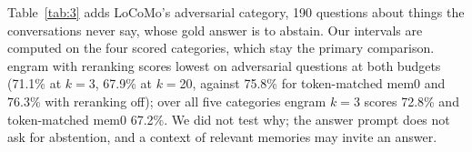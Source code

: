 \documentclass[11pt]{article}
\newcommand{\src}[1]{}
\begin{document}
Table~\ref{tab:3} adds LoCoMo's adversarial category, 190\src{bench/results/heldout\_extra.json} questions about things the conversations never say, whose gold answer is to abstain. Our intervals are computed on the four scored categories, which stay the primary comparison. engram with reranking scores lowest on adversarial questions at both budgets (71.1\%\src{bench/results/heldout\_extra.json} at $k{=}$3, 67.9\%\src{bench/results/heldout\_extra.json} at $k{=}$20, against 75.8\%\src{bench/results/heldout\_extra.json} for token-matched mem0 and 76.3\%\src{bench/results/heldout\_extra.json} with reranking off); over all five categories engram $k{=}$3 scores 72.8\%\src{bench/results/heldout\_extra.json} and token-matched mem0 67.2\%\src{bench/results/heldout\_extra.json}. We did not test why; the answer prompt does not ask for abstention, and a context of relevant memories may invite an answer.
\end{document}
